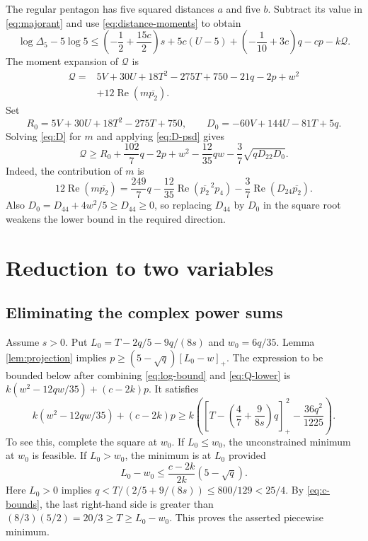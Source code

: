 \documentclass[11pt]{article}
\theoremstyle{remark}
\newcommand{\pos}[1]{[#1]_+}
\newcommand{\Rea}{\operatorname{Re}}
\numberwithin{equation}{section}
\begin{document}
The regular pentagon has five squared distances $a$ and five $b$.
Subtract its value in \eqref{eq:majorant} and use
\eqref{eq:distance-moments} to obtain
\begin{equation}\label{eq:log-bound}
 \log\Delta_5-5\log5\le
 \left(-\frac12+\frac{15c}{2}\right)s+5c(U-5)
 +\left(-\frac1{10}+3c\right)q-cp-k\mathcal Q.
\end{equation}
The moment expansion of $\mathcal Q$ is
\begin{equation}\label{eq:Q-expand}
\begin{aligned}
 \mathcal Q={}&5V+30U+18T^2-275T+750-21q-2p+w^2\\
             &+12\Rea(m\overline{p_2}).
\end{aligned}
\end{equation}
Set
\[
 R_0=5V+30U+18T^2-275T+750,\qquad
 D_0=-60V+144U-81T+5q.
\]
Solving \eqref{eq:D} for $m$ and applying \eqref{eq:D-psd} gives
\begin{equation}\label{eq:Q-lower}
 \mathcal Q\ge R_0+\frac{102}{7}q-2p+w^2-\frac{12}{35}qw
       -\frac37\sqrt{qD_{22}D_0}.
\end{equation}
Indeed, the contribution of $m$ is
\[
12\Rea(m\overline{p_2})
 =\frac{249}{7}q-\frac{12}{35}\Rea(\overline{p_2}^{\,2}p_4)
 -\frac37\Rea(D_{24}\overline{p_2}).
\]
Also $D_0=D_{44}+4w^2/5\ge D_{44}\ge0$, so replacing $D_{44}$
by $D_0$ in the square root weakens the lower bound in the required
direction.

\section{Reduction to two variables}
\subsection{Eliminating the complex power sums}
Assume $s>0$. Put $L_0=T-2q/5-9q/(8s)$ and $w_0=6q/35$.
Lemma \ref{lem:projection} implies
$p\ge(5-\sqrt q)\pos{L_0-w}$.
The expression to be bounded below after combining
\eqref{eq:log-bound} and \eqref{eq:Q-lower} is
$k(w^2-12qw/35)+(c-2k)p$.
It satisfies
\begin{equation}\label{eq:eliminate-pw}
 k(w^2-12qw/35)+(c-2k)p
 \ge k\left(\pos{T-\left(\frac47+\frac9{8s}\right)q}^{\,2}
                  -\frac{36q^2}{1225}\right).
\end{equation}
To see this, complete the square at $w_0$.
If $L_0\le w_0$, the unconstrained minimum at $w_0$ is feasible.
If $L_0>w_0$, the minimum is at $L_0$ provided
\[
 L_0-w_0\le\frac{c-2k}{2k}(5-\sqrt q).
\]
Here $L_0>0$ implies
$q<T/(2/5+9/(8s))\le800/129<25/4$.
By \eqref{eq:c-bounds}, the last right-hand side is greater than
$(8/3)(5/2)=20/3\ge T\ge L_0-w_0$.
This proves the asserted piecewise minimum.
\end{document}
